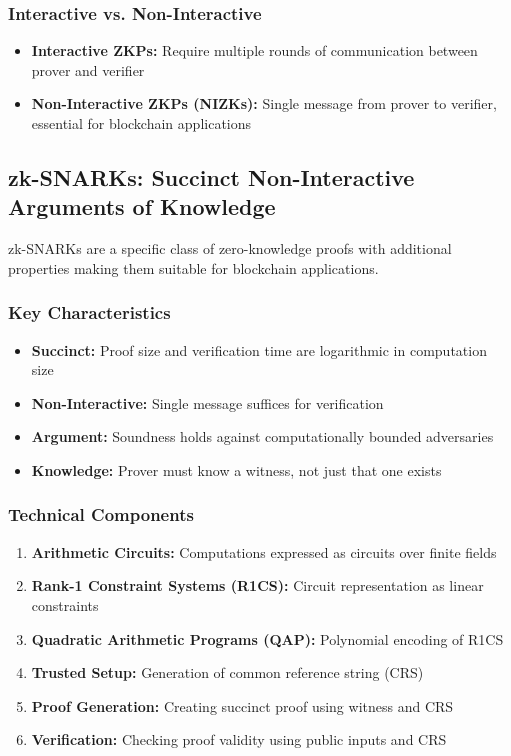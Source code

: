 \subsubsection{Interactive vs. Non-Interactive}
\begin{itemize}
    \item \textbf{Interactive ZKPs:} Require multiple rounds of communication between prover and verifier
    \item \textbf{Non-Interactive ZKPs (NIZKs):} Single message from prover to verifier, essential for blockchain applications
\end{itemize}

\subsection{zk-SNARKs: Succinct Non-Interactive Arguments of Knowledge}

zk-SNARKs are a specific class of zero-knowledge proofs with additional properties making them suitable for blockchain applications.

\subsubsection{Key Characteristics}
\begin{itemize}
    \item \textbf{Succinct:} Proof size and verification time are logarithmic in computation size
    \item \textbf{Non-Interactive:} Single message suffices for verification
    \item \textbf{Argument:} Soundness holds against computationally bounded adversaries
    \item \textbf{Knowledge:} Prover must know a witness, not just that one exists
\end{itemize}

\subsubsection{Technical Components}
\begin{enumerate}
    \item \textbf{Arithmetic Circuits:} Computations expressed as circuits over finite fields
    \item \textbf{Rank-1 Constraint Systems (R1CS):} Circuit representation as linear constraints
    \item \textbf{Quadratic Arithmetic Programs (QAP):} Polynomial encoding of R1CS
    \item \textbf{Trusted Setup:} Generation of common reference string (CRS)
    \item \textbf{Proof Generation:} Creating succinct proof using witness and CRS
    \item \textbf{Verification:} Checking proof validity using public inputs and CRS
\end{enumerate}


